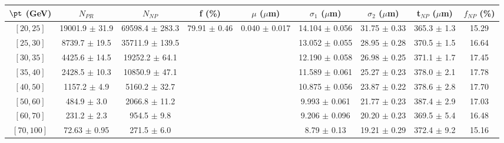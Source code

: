 \begin{tabular}{c||c|c|c|c|c|c|c||c}
$\pt$ (GeV) & $N_{PR}$ & $N_{NP}$ & f (\%) & $\mu$ ($\mu$m) & $\sigma_1$ ($\mu$m) & $\sigma_2$ ($\mu$m)  & t$_{NP}$ ($\mu$m) & $f_{NP}$ (\%) \\
\hline
$[20, 25]$ & 19001.9 $\pm$ 31.9 & 69598.4 $\pm$ 283.3 & \multirow{8}{*}{79.91 $\pm$ 0.46} & \multirow{8}{*}{0.040 $\pm$ 0.017} & 14.104 $\pm$ 0.056 & 31.75 $\pm$ 0.33 & 365.3 $\pm$ 1.3 & 15.29\\
$[25, 30]$ & 8739.7 $\pm$ 19.5 & 35711.9 $\pm$ 139.5 &  &  & 13.052 $\pm$ 0.055 & 28.95 $\pm$ 0.28 & 370.5 $\pm$ 1.5 & 16.64\\
$[30, 35]$ & 4425.6 $\pm$ 14.5 & 19252.2 $\pm$ 64.1 &  &  & 12.190 $\pm$ 0.058 & 26.98 $\pm$ 0.25 & 371.1 $\pm$ 1.7 & 17.45\\
$[35, 40]$ & 2428.5 $\pm$ 10.3 & 10850.9 $\pm$ 47.1 &  &  & 11.589 $\pm$ 0.061 & 25.27 $\pm$ 0.23 & 378.0 $\pm$ 2.1 & 17.78\\
$[40, 50]$ & 1157.2 $\pm$ 4.9 & 5160.2 $\pm$ 32.7 &  &  & 10.875 $\pm$ 0.056 & 23.87 $\pm$ 0.22 & 378.6 $\pm$ 2.8 & 17.70\\
$[50, 60]$ & 484.9 $\pm$ 3.0 & 2066.8 $\pm$ 11.2 &  &  & 9.993 $\pm$ 0.061 & 21.77 $\pm$ 0.23 & 387.4 $\pm$ 2.9 & 17.03\\
$[60, 70]$ & 231.2 $\pm$ 2.3 & 954.5 $\pm$ 9.8 &  &  & 9.206 $\pm$ 0.096 & 20.20 $\pm$ 0.23 & 369.5 $\pm$ 5.4 & 16.48\\
$[70, 100]$ & 72.63 $\pm$ 0.95 & 271.5 $\pm$ 6.0 &  &  & 8.79 $\pm$ 0.13 & 19.21 $\pm$ 0.29 & 372.4 $\pm$ 9.2 & 15.16\\
\end{tabular}
